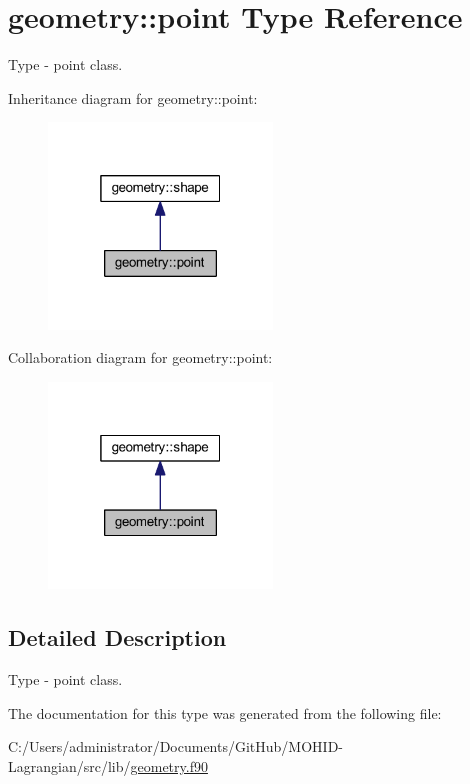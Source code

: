 \hypertarget{structgeometry_1_1point}{}\section{geometry\+:\+:point Type Reference}
\label{structgeometry_1_1point}


Type -\/ point class.  




Inheritance diagram for geometry\+:\+:point\+:\nopagebreak
\begin{figure}[H]
\begin{center}
\leavevmode
\includegraphics[width=169pt]{structgeometry_1_1point__inherit__graph}
\end{center}
\end{figure}


Collaboration diagram for geometry\+:\+:point\+:\nopagebreak
\begin{figure}[H]
\begin{center}
\leavevmode
\includegraphics[width=169pt]{structgeometry_1_1point__coll__graph}
\end{center}
\end{figure}


\subsection{Detailed Description}
Type -\/ point class. 

The documentation for this type was generated from the following file\+:\begin{DoxyCompactItemize}
\item 
C\+:/\+Users/administrator/\+Documents/\+Git\+Hub/\+M\+O\+H\+I\+D-\/\+Lagrangian/src/lib/\mbox{\hyperlink{geometry_8f90}{geometry.\+f90}}\end{DoxyCompactItemize}
